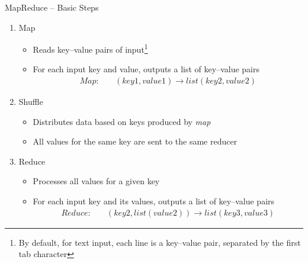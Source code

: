 \documentclass[ignorenonframetext,xcolor=x11names]{beamer}
\begin{document}
\begin{frame}{MapReduce -- Basic Steps}
\begin{enumerate}
\item Map
\begin{itemize}
   \item Reads key--value pairs of input\footnote{By default, for text input, each line is a key--value pair, separated by the first tab character}
   \item For each input key and value, outputs a list of key--value pairs
\begin{align*}
Map: &\quad(key1, value1) \rightarrow list(key2, value2)
\end{align*}
\vspace{-1.25\baselineskip}
\end{itemize}
\item Shuffle
\begin{itemize}
   \item Distributes data based on keys produced by \emph{map}
   \item All values for the same key are sent to the same reducer
\end{itemize}
\item Reduce
\begin{itemize}
   \item Processes all values for a given key
   \item For each input key and its values, outputs a list of key--value pairs
\begin{align*}
Reduce: &\quad(key2, list(value2)) \rightarrow list(key3, value3)
\end{align*}
\end{itemize}
\end{enumerate}
\end{frame}


\end{document}
